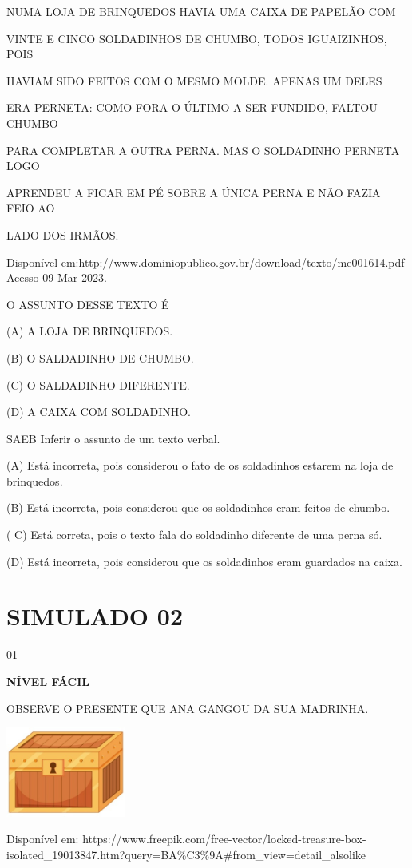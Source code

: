 {{NUMA LOJA DE BRINQUEDOS HAVIA UMA CAIXA DE PAPELÃO COM

VINTE E CINCO SOLDADINHOS DE CHUMBO, TODOS IGUAIZINHOS, POIS

HAVIAM SIDO FEITOS COM O MESMO MOLDE. APENAS UM DELES

ERA PERNETA: COMO FORA O ÚLTIMO A SER FUNDIDO, FALTOU CHUMBO

PARA COMPLETAR A OUTRA PERNA. MAS O SOLDADINHO PERNETA LOGO

APRENDEU A FICAR EM PÉ SOBRE A ÚNICA PERNA E NÃO FAZIA FEIO AO

LADO DOS IRMÃOS.

Disponível
em:\url{http://www.dominiopublico.gov.br/download/texto/me001614.pdf}
Acesso 09 Mar 2023.

O ASSUNTO DESSE TEXTO É

(A) A LOJA DE BRINQUEDOS.

(B) O SALDADINHO DE CHUMBO.

(C) O SALDADINHO DIFERENTE.

(D) A CAIXA COM SOLDADINHO.

SAEB Inferir o assunto de um texto verbal.

(A) Está incorreta, pois considerou o fato de os soldadinhos estarem na
loja de brinquedos.

(B) Está incorreta, pois considerou que os soldadinhos eram feitos de
chumbo.

( C) Está correta, pois o texto fala do soldadinho diferente de uma
perna só.

(D) Está incorreta, pois considerou que os soldadinhos eram guardados na
caixa.

\section{SIMULADO 02}

\num{01}

\textbf{NÍVEL FÁCIL}

OBSERVE O PRESENTE QUE ANA GANGOU DA SUA MADRINHA.

\includegraphics[width=1.55556in,height=1.16111in]{media/image147.jpeg}

Disponível em:
https://www.freepik.com/free-vector/locked-treasure-box-isolated\_19013847.htm?query=BA\%C3\%9A\#from\_view=detail\_alsolike

}}

